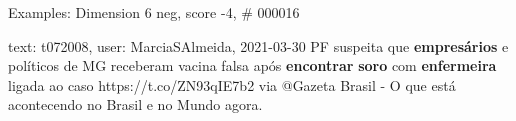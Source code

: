\begin{frame}{Examples: Dimension 6 neg, score -4, \# 000016}
\footnotesize
\begin{alertblock}{text: t072008, user: MarciaSAlmeida, 2021-03-30}
PF suspeita que \textbf{empresários} e políticos de MG receberam vacina falsa 
após \textbf{encontrar} \textbf{soro} com \textbf{enfermeira} ligada ao caso 
https://t.co/ZN93qIE7b2 via @Gazeta Brasil - O que está acontecendo no Brasil e 
no Mundo agora. 
\end{alertblock}
\end{frame}
